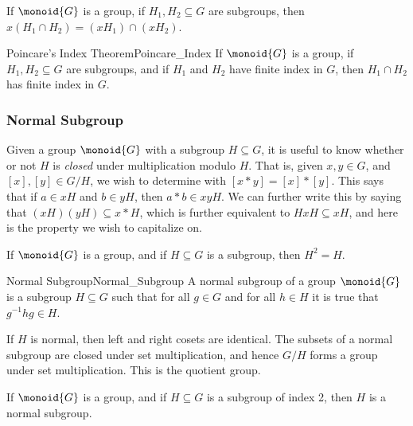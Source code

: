            \begin{theorem}
                If $\monoid{G}$ is a group, if $H_{1},H_{2}\subseteq{G}$ are
                subgroups, then $x(H_{1}\cap{H}_{2})=(xH_{1})\cap(xH_{2})$.
            \end{theorem}
            \begin{ftheorem}{Poincare's Index Theorem}{Poincare_Index}
                If $\monoid{G}$ is a group, if $H_{1},H_{2}\subseteq{G}$ are
                subgroups, and if $H_{1}$ and $H_{2}$ have finite index
                in $G$, then $H_{1}\cap{H}_{2}$ has finite index in $G$.
            \end{ftheorem}
        \subsubsection{Normal Subgroup}
            Given a group $\monoid{G}$ with a subgroup $H\subseteq{G}$, it
            is useful to know whether or not $H$ is \textit{closed} under
            multiplication modulo $H$. That is, given $x,y\in{G}$, and
            $[x],[y]\in{G}/H$, we wish to determine with $[x*y]=[x]*[y]$.
            This says that if $a\in{x}H$ and $b\in{y}H$, then $a*b\in{x}yH$.
            We can further write this by saying that
            $(xH)(yH)\subseteq{x}*H$, which is further equivalent to
            $HxH\subseteq{x}H$, and here is the property we wish to
            capitalize on.
            \begin{theorem}
                If $\monoid{G}$ is a group, and if $H\subseteq{G}$ is a
                subgroup, then $H^{2}=H$.
            \end{theorem}
            \begin{fdefinition}{Normal Subgroup}{Normal_Subgroup}
                A normal subgroup of a group $\monoid{G}$ is a subgroup
                $H\subseteq{G}$ such that for all $g\in{G}$ and for all
                $h\in{H}$ it is true that $g^{\minus{1}}hg\in{H}$.
            \end{fdefinition}
            If $H$ is normal, then left and right cosets are identical.
            The subsets of a normal subgroup are closed under set
            multiplication, and hence $G/H$ forms a group under set
            multiplication. This is the quotient group.
            \begin{theorem}
                If $\monoid{G}$ is a group, and if $H\subseteq{G}$ is a
                subgroup of index 2, then $H$ is a normal subgroup.
            \end{theorem}
